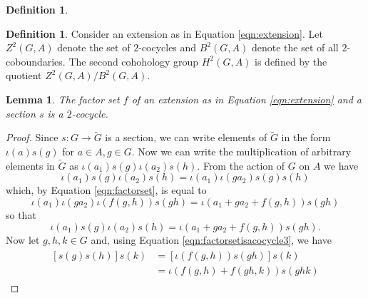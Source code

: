 \documentclass{dcthesis}
\newcommand{\defi}[1]{\textsf{#1}}
\newcommand{\mm}[1]{{\color{blue} \sf MM: [#1]}}
\newcommand{\wt}[1]{\widetilde{#1}}
\newtheorem{lemma}[prop]{Lemma}
\theoremstyle{definition}
\newtheorem{definition}[prop]{Definition}
\theoremstyle{remark}
\numberwithin{equation}{section}
\numberwithin{figure}{section}
\begin{document}
{{\begin{definition}
    \end{definition}
    \begin{definition}
      \label{def:h2}
      Consider an extension as in Equation \ref{eqn:extension}.
      Let $Z^2(G,A)$ denote the set
      of $2$-cocycles and $B^2(G,A)$
      denote the set of all $2$-coboundaries.
      The \defi{second cohohology group} $H^2(G,A)$
      is defined by the
      quotient $Z^2(G,A)/B^2(G,A)$.
    \end{definition}
    \begin{lemma}
      \label{lem:factorsetisacocycle}
      The factor set $f$ of an extension
      as in Equation \ref{eqn:extension}
      and a section $s$ is a $2$-cocycle.
    \end{lemma}
    \begin{proof}
      Since $s\colon G\to\wt{G}$ is a section,
      we can write elements of $\wt{G}$ in the form
      $\iota(a)s(g)$ for $a\in A, g\in G$.
      Now we can write the multiplication of arbitrary elements in $\wt{G}$ as
      $\iota(a_1)s(g)\iota(a_2)s(h)$.
      From the action of $G$ on $A$ we have
      \begin{equation}
        \label{eqn:factorsetisacocycle1}
        \iota(a_1)s(g)\iota(a_2)s(h) = \iota(a_1)\iota(ga_2)s(g)s(h)
      \end{equation}
      which, by Equation \ref{eqn:factorset},
      is equal to
      \begin{equation}
        \label{eqn:factorsetisacocycle2}
        \iota(a_1)\iota(ga_2)\iota(f(g,h))s(gh)
        =\iota(a_1+ga_2+f(g,h))s(gh)
      \end{equation}
      so that
      \begin{equation}
        \label{eqn:factorsetisacocycle3}
        \iota(a_1)s(g)\iota(a_2)s(h)
        =\iota(a_1+ga_2+f(g,h))s(gh).
      \end{equation}
      Now let $g,h,k\in G$ and,
      using Equation \ref{eqn:factorsetisacocycle3},
      we have
      \begin{align}
        \label{eqn:associative1}
        \begin{split}
          [s(g)s(h)]s(k) &= [\iota(f(g,h))s(gh)]s(k)\\
                         &= \iota(f(g,h)+f(gh,k))s(ghk)

\end{split}
\end{align}
\end{proof}}}
\end{document}
